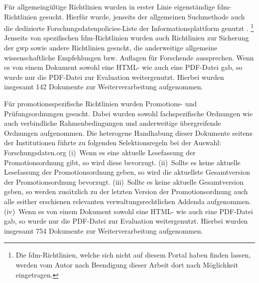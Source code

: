 Für allgemeingültige Richtlinien wurden in erster Linie eigenständige \gls{fdm}-Richtlinien gesucht.
Hierfür wurde, jenseits der allgemeinen Suchmethode auch die dedizierte Forschungsdatenpolicies-Liste der Informationsplattform \citeauthor{Forschungsdaten2024} genutzt \autocite{Forschungsdaten2024}.%
\footnote{%
    Die \gls{fdm}-Richtlinien, welche sich nicht auf diesem Portal haben finden lassen, werden vom Autor nach Beendigung dieser Arbeit dort nach Möglichkeit eingetragen.%
}
Jenseits von spezifischen \gls{fdm}-Richtlinien wurden auch Richtlinien zur Sicherung der \gls{gwp} sowie andere Richtlinien gesucht, die anderweitige allgemeine wissenschaftliche Empfehlungen bzw. Auflagen für Forschende aussprechen.
Wenn es von einem Dokument sowohl eine HTML- wie auch eine PDF-Datei gab, so wurde nur die PDF-Datei zur Evaluation weitergenutzt.
Hierbei wurden insgesamt 142 Dokumente zur Weiterverarbeitung aufgenommen.

Für promotionsspezifische Richtlinien wurden Promotions- und Prüfungsordnungen gesucht.
Dabei wurden sowohl fachspezifische Ordnungen wie auch verbindliche Rahmenbedingungen und anderweitige übergreifende Ordnungen aufgenommen.
Die heterogene Handhabung dieser Dokumente seitens der Institutionen führte zu folgenden Selektionsregeln bei der Auswahl:
Forschungsdaten.org
(i)~Wenn es eine aktuelle Lesefassung der Promotionsordnung gibt, so wird diese bevorzugt.
(ii)~Sollte es keine aktuelle Lesefassung der Promotionsordnung geben, so wird die aktuellste Gesamtversion der Promotionsordnung bevorzugt.
(iii)~Sollte es keine aktuelle Gesamtversion geben, so werden zusätzlich zu der letzten Version der Promotionsordnung auch alle seither erschienen relevanten verwaltungsrechtlichen Addenda aufgenommen.
(iv)~Wenn es von einem Dokument sowohl eine HTML- wie auch eine PDF-Datei gab, so wurde nur die PDF-Datei zur Evaluation weitergenutzt.
Hierbei wurden insgesamt 754 Dokumente zur Weiterverarbeitung aufgenommen.

